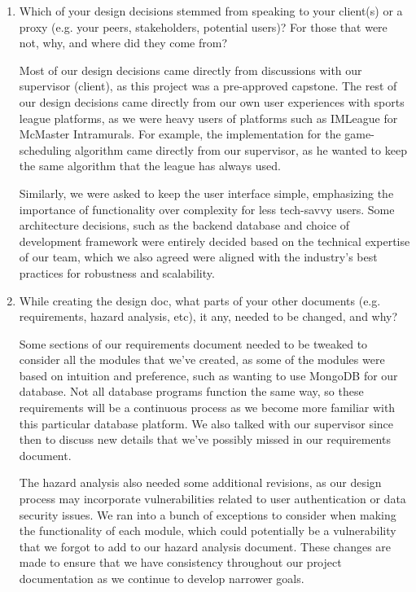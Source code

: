 \documentclass[12pt, titlepage]{article}
\begin{document}
\begin{enumerate}
  \item Which of your design decisions stemmed from speaking to your client(s)
        or a proxy (e.g. your peers, stakeholders, potential users)? For those that
        were not, why, and where did they come from?

        Most of our design decisions came directly from discussions with our supervisor (client), as this project was a pre-approved capstone. The rest of our design decisions came directly from our own user experiences with sports league platforms, as we were heavy users of platforms such as IMLeague for McMaster Intramurals. For example, the implementation for the game-scheduling algorithm came directly from our supervisor, as he wanted to keep the same algorithm that the league has always used.

        Similarly, we were asked to keep the user interface simple, emphasizing the importance of functionality over complexity for less tech-savvy users. Some architecture decisions, such as the backend database and choice of development framework were entirely decided based on the technical expertise of our team, which we also agreed were aligned with the industry’s best practices for robustness and scalability.

  \item While creating the design doc, what parts of your other documents (e.g.
        requirements, hazard analysis, etc), it any, needed to be changed, and why?

        Some sections of our requirements document needed to be tweaked to consider all the modules that we’ve created, as some of the modules were based on intuition and preference, such as wanting to use MongoDB for our database. Not all database programs function the same way, so these requirements will be a continuous process as we become more familiar with this particular database platform. We also talked with our supervisor since then to discuss new details that we’ve possibly missed in our requirements document.

        The hazard analysis also needed some additional revisions, as our design process may incorporate vulnerabilities related to user authentication or data security issues. We ran into a bunch of exceptions to consider when making the functionality of each module, which could potentially be a vulnerability that we forgot to add to our hazard analysis document. These changes are made to ensure that we have consistency throughout our project documentation as we continue to develop narrower goals.


\end{enumerate}
\end{document}
